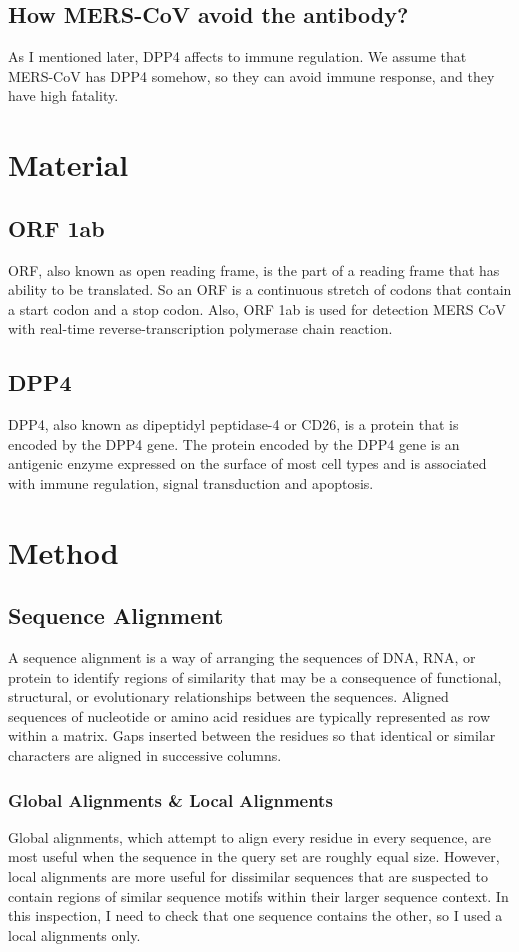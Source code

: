\documentclass[aps,10pt,a4paper]{article}
\begin{document}
		\subsection{How MERS-CoV avoid the antibody?}
			As I mentioned later, DPP4 affects to immune regulation. We assume that MERS-CoV has DPP4 somehow, so they can avoid immune response, and they have high fatality. 
	
	\section{Material}
		\subsection{ORF 1ab}
			ORF, also known as open reading frame, is the part of a reading frame that has ability to be translated. So an ORF is a continuous stretch of codons that contain a start codon and a stop codon. 
			Also, ORF 1ab is used for detection MERS CoV with real-time reverse-transcription polymerase chain reaction.\cite{ref:detectMERS}
		
		\subsection{DPP4}
			DPP4, also known as dipeptidyl peptidase-4 or CD26, is a protein that is encoded by the DPP4 gene. The protein encoded by the DPP4 gene is an antigenic enzyme expressed on the surface of most cell types and is associated with immune regulation, signal transduction and apoptosis. 
	
	\section{Method}
		\subsection{Sequence Alignment}
			A sequence alignment is a way of arranging the sequences of DNA, RNA, or protein to identify regions of similarity that may be a consequence of functional, structural, or evolutionary relationships between the sequences. Aligned sequences of nucleotide or amino acid residues are typically represented as row within a matrix. Gaps inserted between the residues so that identical or similar characters are aligned in successive columns.
			
			\subsubsection{Global Alignments \& Local Alignments}
				Global alignments, which attempt to align every residue in every sequence, are most useful when the sequence in the query set are roughly equal size. However, local alignments are more useful for dissimilar sequences that are suspected to contain regions of similar sequence motifs within their larger sequence context. In this inspection, I need to check that one sequence contains the other, so I used a local alignments only. 
				
\end{document}
